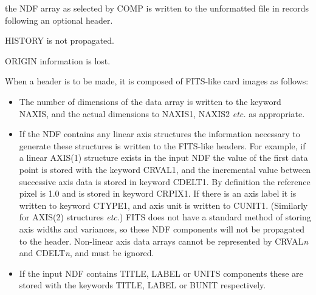 \documentclass[twoside,11pt]{article}
\newcommand{\ssthitemlist}[1]{
  \latexonly{
  \mbox{} \\
  \vspace{-3.5ex}
  }
  \begin{itemize}
     #1
  \end{itemize}
}
\newcommand{\sstitem}{\item}
\newcommand{\sstitem}{\item}
\begin{document}
{{{         \sstitem
            the NDF array as selected by COMP is written to the
            unformatted file in records following an optional header.

         \sstitem
            HISTORY is not propagated.

         \sstitem
            ORIGIN information is lost.

         \sstitem
            When a header is to be made, it is composed of FITS-like card
            images as follows:
      
         \ssthitemlist{

            \sstitem
               The number of dimensions of the data array is written
               to the keyword NAXIS, and the actual dimensions to NAXIS1,
               NAXIS2 {\it etc.} as appropriate.

            \sstitem
               If the NDF contains any linear axis structures the
               information necessary to generate these structures is
               written to the FITS-like headers. For example, if a linear
               AXIS(1) structure exists in the input NDF the value of the
               first data point is stored with the keyword CRVAL1,
               and the incremental value between successive axis data is
               stored in keyword CDELT1.  By definition the reference pixel is
               1.0 and is stored in keyword CRPIX1.  If there is an axis label
               it is written to keyword CTYPE1, and axis unit is written to CUNIT1.
               (Similarly for AXIS(2) structures {\it etc.}) FITS does not have
               a standard method of storing axis widths and variances, so these
               NDF components will not be propagated to the header.
               Non-linear axis data arrays cannot be represented by CRVAL{\em{n}}
               and CDELT{\em{n}}, and must be ignored.

            \sstitem
               If the input NDF contains TITLE, LABEL or UNITS components
               these are stored with the keywords TITLE, LABEL or BUNIT
               respectively.

}}}}
\end{document}
